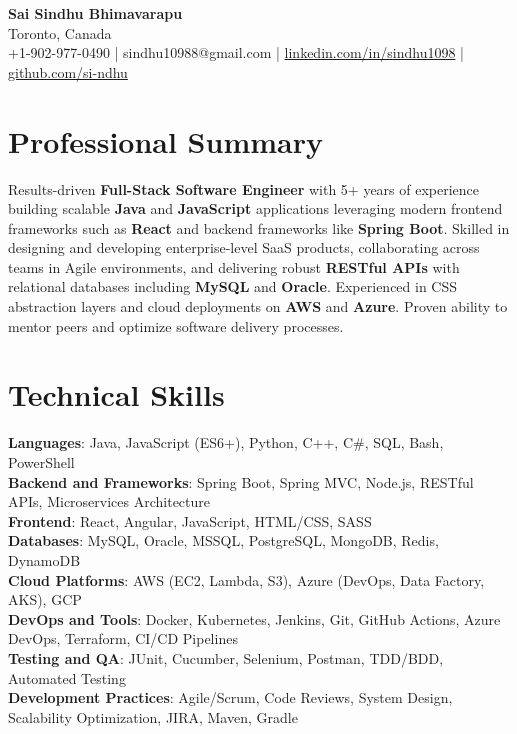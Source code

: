 \documentclass[letterpaper,11pt]{article}
\begin{document}
\begin{center}
  {\Large \textbf{Sai Sindhu Bhimavarapu}} \\
  Toronto, Canada \\
  +1-902-977-0490 \enspace | \enspace sindhu10988@gmail.com \enspace | \enspace \href{https://www.linkedin.com/in/sindhu1098/}{linkedin.com/in/sindhu1098} \enspace | \enspace \href{https://github.com/si-ndhu}{github.com/si-ndhu}
\end{center}

\section{Professional Summary}
  \begin{itemize}[leftmargin=0.15in, label={}]
    \small{\item{
     Results-driven \textbf{Full-Stack Software Engineer} with 5+ years of experience building scalable \textbf{Java} and \textbf{JavaScript} applications leveraging modern frontend frameworks such as \textbf{React} and backend frameworks like \textbf{Spring Boot}. Skilled in designing and developing enterprise-level SaaS products, collaborating across teams in Agile environments, and delivering robust \textbf{RESTful APIs} with relational databases including \textbf{MySQL} and \textbf{Oracle}. Experienced in CSS abstraction layers and cloud deployments on \textbf{AWS} and \textbf{Azure}. Proven ability to mentor peers and optimize software delivery processes.
    }}
  \end{itemize}
\vspace{-16pt}

\section{Technical Skills}
 \begin{itemize}[leftmargin=0.15in, label={}]
    \small{\item{
     \textbf{Languages}: Java, JavaScript (ES6+), Python, C++, C\#, SQL, Bash, PowerShell \\
     \textbf{Backend and Frameworks}: Spring Boot, Spring MVC, Node.js, RESTful APIs, Microservices Architecture \\
     \textbf{Frontend}: React, Angular, JavaScript, HTML/CSS, SASS \\
     \textbf{Databases}: MySQL, Oracle, MSSQL, PostgreSQL, MongoDB, Redis, DynamoDB \\
     \textbf{Cloud Platforms}: AWS (EC2, Lambda, S3), Azure (DevOps, Data Factory, AKS), GCP \\
     \textbf{DevOps and Tools}: Docker, Kubernetes, Jenkins, Git, GitHub Actions, Azure DevOps, Terraform, CI/CD Pipelines \\
     \textbf{Testing and QA}: JUnit, Cucumber, Selenium, Postman, TDD/BDD, Automated Testing \\
     \textbf{Development Practices}: Agile/Scrum, Code Reviews, System Design, Scalability Optimization, JIRA, Maven, Gradle
    }}
 \end{itemize}
\vspace{-16pt}
\end{document}
